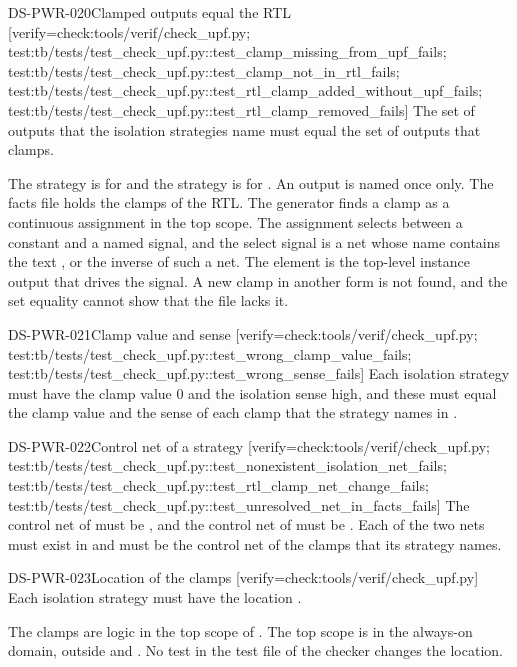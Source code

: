 \begin{requirement}{DS-PWR-020}{Clamped outputs equal the RTL}
[verify={check:tools/verif/check_upf.py; test:tb/tests/test_check_upf.py::test_clamp_missing_from_upf_fails; test:tb/tests/test_check_upf.py::test_clamp_not_in_rtl_fails; test:tb/tests/test_check_upf.py::test_rtl_clamp_added_without_upf_fails; test:tb/tests/test_check_upf.py::test_rtl_clamp_removed_fails}]
The set of outputs that the isolation strategies name must equal the set of outputs that  clamps.
\end{requirement}
\begin{information}
The strategy  is for  and the strategy  is for . An output is named once only. The facts file holds the clamps of the RTL. The generator finds a clamp as a continuous assignment in the top scope. The assignment selects between a constant and a named signal, and the select signal is a net whose name contains the text , or the inverse of such a net. The element is the top-level instance output that drives the signal. A new clamp in another form is not found, and the set equality cannot show that the file lacks it.
\end{information}

\begin{requirement}{DS-PWR-021}{Clamp value and sense}
[verify={check:tools/verif/check_upf.py; test:tb/tests/test_check_upf.py::test_wrong_clamp_value_fails; test:tb/tests/test_check_upf.py::test_wrong_sense_fails}]
Each isolation strategy must have the clamp value 0 and the isolation sense high, and these must equal the clamp value and the sense of each clamp that the strategy names in .
\end{requirement}

\begin{requirement}{DS-PWR-022}{Control net of a strategy}
[verify={check:tools/verif/check_upf.py; test:tb/tests/test_check_upf.py::test_nonexistent_isolation_net_fails; test:tb/tests/test_check_upf.py::test_rtl_clamp_net_change_fails; test:tb/tests/test_check_upf.py::test_unresolved_net_in_facts_fails}]
The control net of  must be , and the control net of  must be . Each of the two nets must exist in  and must be the control net of the clamps that its strategy names.
\end{requirement}

\begin{requirement}{DS-PWR-023}{Location of the clamps}
[verify={check:tools/verif/check_upf.py}]
Each isolation strategy must have the location .
\end{requirement}
\begin{information}
The clamps are logic in the top scope of . The top scope is in the always-on domain, outside  and . No test in the test file of the checker changes the location.
\end{information}

